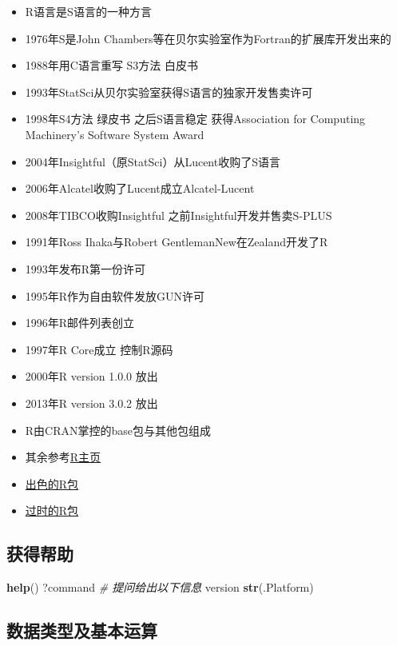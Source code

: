 \documentclass[]{book}
\newenvironment{Shaded}{\begin{snugshade}}{\end{snugshade}}
\newcommand{\CommentTok}[1]{\textcolor[rgb]{0.56,0.35,0.01}{\textit{#1}}}
\newcommand{\KeywordTok}[1]{\textcolor[rgb]{0.13,0.29,0.53}{\textbf{#1}}}
\newcommand{\NormalTok}[1]{#1}
\providecommand{\tightlist}{%
  \setlength{\itemsep}{0pt}\setlength{\parskip}{0pt}}
\begin{document}
\begin{itemize}
\tightlist
\item
  R语言是S语言的一种方言
\item
  1976年S是John Chambers等在贝尔实验室作为Fortran的扩展库开发出来的
\item
  1988年用C语言重写 S3方法 白皮书
\item
  1993年StatSci从贝尔实验室获得S语言的独家开发售卖许可
\item
  1998年S4方法 绿皮书 之后S语言稳定 获得Association for Computing Machinery's Software System Award
\item
  2004年Insightful（原StatSci）从Lucent收购了S语言
\item
  2006年Alcatel收购了Lucent成立Alcatel-Lucent
\item
  2008年TIBCO收购Insightful 之前Insightful开发并售卖S-PLUS
\item
  1991年Ross Ihaka与Robert GentlemanNew在Zealand开发了R
\item
  1993年发布R第一份许可
\item
  1995年R作为自由软件发放GUN许可
\item
  1996年R邮件列表创立
\item
  1997年R Core成立 控制R源码
\item
  2000年R version 1.0.0 放出
\item
  2013年R version 3.0.2 放出
\item
  R由CRAN掌控的base包与其他包组成
\item
  其余参考\href{http://www.r-project.org/}{R主页}
\item
  \href{https://github.com/qinwf/awesome-R}{出色的R包}
\item
  \href{http://kbroman.org/hipsteR/}{过时的R包}
\end{itemize}

\hypertarget{ux83b7ux5f97ux5e2eux52a9}{%
\subsection{获得帮助}\label{ux83b7ux5f97ux5e2eux52a9}}

\begin{Shaded}
\begin{Highlighting}[]
\KeywordTok{help}\NormalTok{()}
\NormalTok{?command}
\CommentTok{# 提问给出以下信息}
\NormalTok{version}
\KeywordTok{str}\NormalTok{(.Platform)}
\end{Highlighting}
\end{Shaded}

\hypertarget{ux6570ux636eux7c7bux578bux53caux57faux672cux8fd0ux7b97}{%
\subsection{数据类型及基本运算}\label{ux6570ux636eux7c7bux578bux53caux57faux672cux8fd0ux7b97}}
\end{document}
